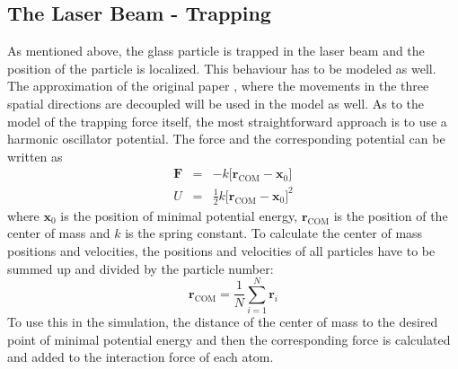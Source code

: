 \documentclass[12pt]{article}
\begin{document}
\subsection{The Laser Beam - Trapping}
As mentioned above, the glass particle is trapped in the laser beam and the position of the particle is localized. This behaviour
has to be modeled as well.\\
The approximation of the original paper \cite{Gieseler2014}, where the movements in the three spatial directions are decoupled will be
used in the model as well. As to the model of the trapping force itself, the most straightforward approach is to use a harmonic oscillator potential.
The force and the corresponding potential can be written as
\begin{eqnarray}
    \mathbf{F} &=& -k \Big[\mathbf{r}_\text{COM}-\mathbf{x}_0\Big]\\
    U &=& \frac12 k \Big[\mathbf{r}_\text{COM}-\mathbf{x}_0\Big]^2
\end{eqnarray}
where $\mathbf{x}_0$ is the position of minimal potential energy, $\mathbf{r}_\text{COM}$ 
is the position of the center of mass and $k$ is the spring constant.
To calculate the center of mass positions and velocities, the positions and velocities of all particles have to be summed up and 
divided by the particle number:
\begin{equation}
    \mathbf{r}_\text{COM} = \frac1N\sum_{i=1}^N \mathbf{r}_i
\end{equation}
To use this in the simulation, the distance of the center of mass to the desired point of minimal potential energy and then the corresponding 
force is calculated and added to the interaction force of each atom.
\end{document}
